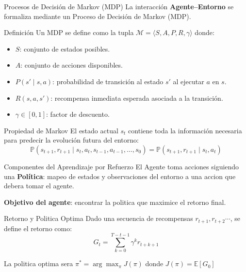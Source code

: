 \begin{frame}{Procesos de Decisión de Markov (MDP)}
    La interacción \textbf{Agente–Entorno} se formaliza mediante un Proceso de Decisión de Markov (MDP).

    \begin{block}{Definición}
        Un MDP se define como la tupla $\mathcal{M} = \langle S, A, P, R, \gamma \rangle$
        donde:
        \begin{itemize}
            \item $S$: conjunto de estados posibles.
            \item $A$: conjunto de acciones disponibles.
            \item $P(s' \mid s,a)$: probabilidad de transición al estado $s'$ al ejecutar $a$ en $s$.
            \item $R(s,a,s')$: recompensa inmediata esperada asociada a la transición.
            \item $\gamma \in [0,1]$: factor de descuento.
        \end{itemize}
    \end{block}

    \begin{block}{Propiedad de Markov}
        El estado actual $s_t$ contiene toda la información necesaria para 
        predecir la evolución futura del entorno:
        \[
            \mathbb{P}(s_{t+1}, r_{t+1} \mid s_t, a_t, s_{t-1}, a_{t-1}, \dots, s_0)
            =
            \mathbb{P}(s_{t+1}, r_{t+1} \mid s_t, a_t)
        \]
    \end{block}
\end{frame}

\begin{frame}{Componentes del Aprendizaje por Refuerzo}
    El Agente toma acciones siguiendo una \textbf{Política}: mapeo de estados y observaciones del entorno a una accion que debera tomar el agente.
    
    \textbf{Objetivo del agente}: encontrar la politica que maximice el retorno final.

    \begin{block}{Retorno y Politica Optima}
        Dado una secuencia de recompensas $r_{t+1},r_{t+2}\cdots$, se define el retorno como:
        $$
        G_t = \sum_{k=0}^{T-t-1} {\gamma^k r_{t+k+1}}
        $$

        La politica optima sera $\pi^\ast = \arg\max_{\pi} J(\pi)$ donde
        $J(\pi) = \mathbb{E}[G_0]$
    \end{block}
\end{frame}

